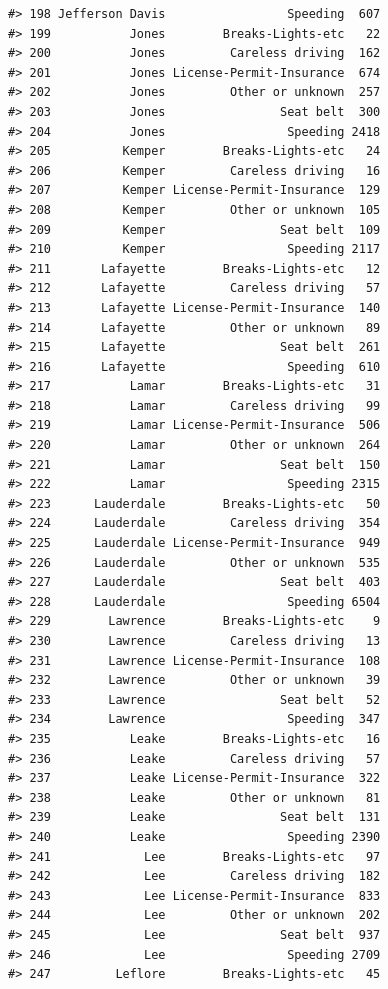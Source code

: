 \documentclass[
]{book}
\begin{document}
\begin{verbatim}
#> 198 Jefferson Davis                 Speeding  607
#> 199           Jones        Breaks-Lights-etc   22
#> 200           Jones         Careless driving  162
#> 201           Jones License-Permit-Insurance  674
#> 202           Jones         Other or unknown  257
#> 203           Jones                Seat belt  300
#> 204           Jones                 Speeding 2418
#> 205          Kemper        Breaks-Lights-etc   24
#> 206          Kemper         Careless driving   16
#> 207          Kemper License-Permit-Insurance  129
#> 208          Kemper         Other or unknown  105
#> 209          Kemper                Seat belt  109
#> 210          Kemper                 Speeding 2117
#> 211       Lafayette        Breaks-Lights-etc   12
#> 212       Lafayette         Careless driving   57
#> 213       Lafayette License-Permit-Insurance  140
#> 214       Lafayette         Other or unknown   89
#> 215       Lafayette                Seat belt  261
#> 216       Lafayette                 Speeding  610
#> 217           Lamar        Breaks-Lights-etc   31
#> 218           Lamar         Careless driving   99
#> 219           Lamar License-Permit-Insurance  506
#> 220           Lamar         Other or unknown  264
#> 221           Lamar                Seat belt  150
#> 222           Lamar                 Speeding 2315
#> 223      Lauderdale        Breaks-Lights-etc   50
#> 224      Lauderdale         Careless driving  354
#> 225      Lauderdale License-Permit-Insurance  949
#> 226      Lauderdale         Other or unknown  535
#> 227      Lauderdale                Seat belt  403
#> 228      Lauderdale                 Speeding 6504
#> 229        Lawrence        Breaks-Lights-etc    9
#> 230        Lawrence         Careless driving   13
#> 231        Lawrence License-Permit-Insurance  108
#> 232        Lawrence         Other or unknown   39
#> 233        Lawrence                Seat belt   52
#> 234        Lawrence                 Speeding  347
#> 235           Leake        Breaks-Lights-etc   16
#> 236           Leake         Careless driving   57
#> 237           Leake License-Permit-Insurance  322
#> 238           Leake         Other or unknown   81
#> 239           Leake                Seat belt  131
#> 240           Leake                 Speeding 2390
#> 241             Lee        Breaks-Lights-etc   97
#> 242             Lee         Careless driving  182
#> 243             Lee License-Permit-Insurance  833
#> 244             Lee         Other or unknown  202
#> 245             Lee                Seat belt  937
#> 246             Lee                 Speeding 2709
#> 247         Leflore        Breaks-Lights-etc   45

\end{verbatim}
\end{document}

